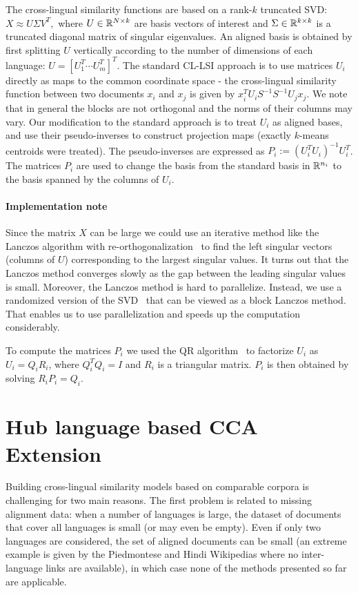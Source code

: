 The cross-lingual similarity functions are based on a rank-$k$ truncated SVD:
$X \approx U \Sigma V^T,$ where $U \in \mathbb{R}^{N \times k}$ are basis vectors of
interest and $\Sigma \in \mathbb{R}^{k \times k}$ is a truncated diagonal matrix of singular
eigenvalues. An aligned basis is obtained by first splitting $U$ vertically according
to the number of dimensions of each language: $U = [U_1^T \cdots U_m^T]^T$. 
The standard CL-LSI approach is to use matrices $U_i$ directly as maps to the common
coordinate space - the cross-lingual similarity function between two documents $x_i$ and
$x_j$ is given by $x_i^T U_i S^{-1} S^{-1} U_j x_j$. We note that in general the blocks
are not orthogonal and the norms of their columns may vary. Our modification to the
standard approach is to treat $U_i$ as aligned bases, and use their pseudo-inverses
to construct projection maps (exactly $k$-means centroids were treated). 
The pseudo-inverses are expressed as $P_i := (U_i^T U_i)^{-1} U_i^T$.
The matrices $P_i$ are used to change the basis from the standard basis in $\mathbb{R}^{n_i}$ to the
basis spanned by the columns of $U_i$.

\paragraph{Implementation note}
Since the matrix $X$ can be large we could use an iterative method like the Lanczos
algorithm with re-orthogonalization~\cite{golub} to find the left singular vectors
(columns of $U$) corresponding to the largest singular values. It turns out that the
Lanczos method converges slowly as the gap between the leading singular values is small.
Moreover, the Lanczos method is hard to parallelize. Instead, we use a randomized version
of the SVD~\cite{tropp} that can be viewed as a block Lanczos method. That enables us
to use parallelization and speeds up the computation considerably.

To compute the matrices $P_i$ we used the QR algorithm~\cite{golub} to factorize
$U_i$ as $U_i = Q_i R_i$, where $Q_i^TQ_i = I$ and $R_i$ is a triangular matrix.
$P_i$ is then obtained by solving $R_i P_i = Q_i$.


\section{Hub language based CCA Extension}\label{chap:crosslingual:hublang}
Building cross-lingual similarity models based on comparable corpora is challenging for
two main reasons. The first problem is related to missing alignment data: when a number
of languages is large, the dataset of documents that cover all languages is small (or may
even be empty). Even if only two languages are considered, the set of aligned documents
can be small (an extreme example is given by the Piedmontese and Hindi Wikipedias where
no inter-language links are available), in which case none of the methods presented so
far are applicable.

